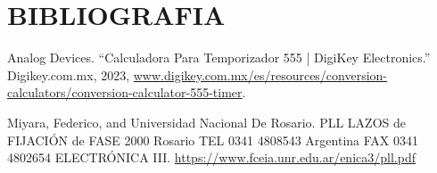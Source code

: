 \section{BIBLIOGRAFIA}
\begin{thebibliography}{00}
Analog Devices. “Calculadora Para Temporizador 555  | DigiKey Electronics.” Digikey.com.mx, 2023, \url{www.digikey.com.mx/es/resources/conversion-calculators/conversion-calculator-555-timer}.

Miyara, Federico, and Universidad Nacional De Rosario. PLL LAZOS de FIJACIÓN de FASE 2000 Rosario TEL 0341 4808543 Argentina FAX 0341 4802654 ELECTRÓNICA III. \url{https://www.fceia.unr.edu.ar/enica3/pll.pdf}

\end{thebibliography}